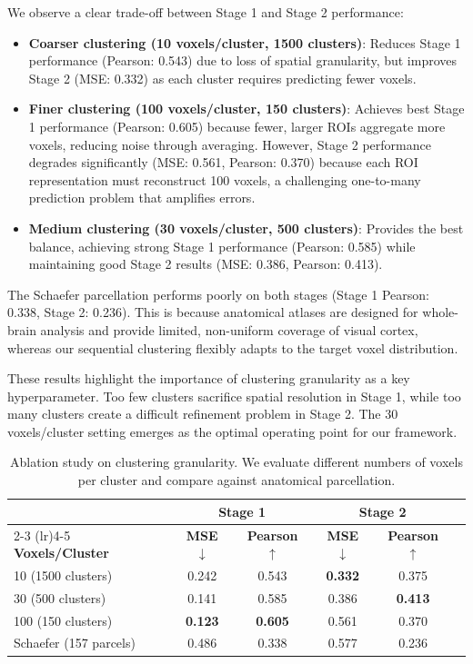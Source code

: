 We observe a clear trade-off between Stage 1 and Stage 2 performance:
\begin{itemize}
  \item \textbf{Coarser clustering (10 voxels/cluster, 1500 clusters)}:
        Reduces Stage 1 performance (Pearson: 0.543) due to loss of spatial granularity,
        but improves Stage 2 (MSE: 0.332) as each cluster requires predicting fewer voxels.

  \item \textbf{Finer clustering (100 voxels/cluster, 150 clusters)}:
        Achieves best Stage 1 performance (Pearson: 0.605) because fewer, larger ROIs
        aggregate more voxels, reducing noise through averaging.
        However, Stage 2 performance degrades significantly (MSE: 0.561, Pearson: 0.370)
        because each ROI representation must reconstruct 100 voxels,
        a challenging one-to-many prediction problem that amplifies errors.

  \item \textbf{Medium clustering (30 voxels/cluster, 500 clusters)}:
        Provides the best balance, achieving strong Stage 1 performance (Pearson: 0.585)
        while maintaining good Stage 2 results (MSE: 0.386, Pearson: 0.413).
\end{itemize}

The Schaefer parcellation performs poorly on both stages (Stage 1 Pearson: 0.338, Stage 2: 0.236).
This is because anatomical atlases are designed for whole-brain analysis
and provide limited, non-uniform coverage of visual cortex,
whereas our sequential clustering flexibly adapts to the target voxel distribution.

These results highlight the importance of clustering granularity as a key hyperparameter.
Too few clusters sacrifice spatial resolution in Stage 1,
while too many clusters create a difficult refinement problem in Stage 2.
The 30 voxels/cluster setting emerges as the optimal operating point for our framework.

\begin{table}[t]
\centering
\caption{Ablation study on clustering granularity.
We evaluate different numbers of voxels per cluster and compare against anatomical parcellation.}
\label{tab:ablation_clustering}
\begin{tabular}{lccccc}
\toprule
& \multicolumn{2}{c}{\textbf{Stage 1}} & \multicolumn{2}{c}{\textbf{Stage 2}} \\
\cmidrule(lr){2-3} \cmidrule(lr){4-5}
\textbf{Voxels/Cluster} & \textbf{MSE} $\downarrow$ & \textbf{Pearson} $\uparrow$ & \textbf{MSE} $\downarrow$ & \textbf{Pearson} $\uparrow$ \\
\midrule
10 (1500 clusters) & 0.242 & 0.543 & \textbf{0.332} & 0.375 \\
30 (500 clusters) & 0.141 & 0.585 & 0.386 & \textbf{0.413} \\
100 (150 clusters) & \textbf{0.123} & \textbf{0.605} & 0.561 & 0.370 \\
\midrule
Schaefer (157 parcels) & 0.486 & 0.338 & 0.577 & 0.236 \\
\bottomrule
\end{tabular}
\end{table}


